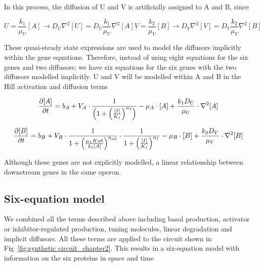 In this process, the diffusion of U and V is artificially assigned to A and B, since

\begin{subequations}\label{[diffuser_artificial]}

\begin{equation}
    U = \frac{k_{1}}{\mu_{U}}[A] \longrightarrow D_{U}
    \nabla^2 [U] = D_{U}\frac{k_{1}}{\mu_{U}}  \nabla^2  [A]\label{eq:equation2}
\end{equation}

\begin{equation}
    V = \frac{k_{2}}{\mu_{V}}[B] \longrightarrow D_{V}
    \nabla^2 [V] =  D_{V}\frac{k_{2}}{\mu_{V}}  \nabla^2  [B]\label{eq:equation}
\end{equation}

\end{subequations}

These quasi-steady state expressions are used to model the diffusors implicitly within the gene equations.
Therefore, instead of using eight equations for the six genes and two diffusors;
we have six equations for the six genes with the two diffusors modelled implicitly.
U and V will be modelled within A and B in the Hill activation and diffusion terms

\begin{equation}
    \pdv{[A]}{t} = b_{A}+V_{A}\cdot \frac{1}{\left(1+\left(\frac{[I]}{K_{I}}\right)^{n_{I}}\right)}-\mu_{A}\cdot[A] + \frac{k_{1}D_{U}}{\mu_{U}}\cdot \nabla^2 [A]
\end{equation}

\begin{equation}
    \pdv{[B]}{t} = b_{B}+V_{B}\cdot\frac{1}{1+\left(\frac{\mu_{u}K{ub}}{k_{1}[A]}\right)^{n_{ab}}}\cdot\frac{1}{1+\left(\frac{[I]}{K_{I}}\right)^{n_{I}}}-\mu_{B}\cdot[B] + \frac{k_{2}D_{V}}{\mu_{V}}\cdot \nabla^2 [B]
\end{equation}

Although these genes are not explicitly modelled, a linear relationship between downstream genes in the same operon.

\subsection{Six-equation model}
We combined all the terms described above including basal production,
activator or inhibitor-regulated production, tuning molecules, linear degradation and implicit diffusors.
All these terms are applied to the circuit shown in Fig~\ref{fig:synthetic circuit_chapter2}.
This results in a six-equation model with information on the six proteins in space and time

